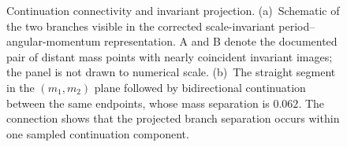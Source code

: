 \begin{figure}[t]
\caption{\label{fig:projection}Continuation connectivity and invariant projection.
(a)~Schematic of the two branches visible in the corrected scale-invariant
period--angular-momentum representation. A and B denote the documented pair
of distant mass points with nearly coincident invariant images; the panel is
not drawn to numerical scale. (b)~The straight segment in the $(m_1,m_2)$
plane followed by bidirectional continuation between the same endpoints,
whose mass separation is $0.062$. The connection shows that the projected
branch separation occurs within one sampled continuation component.}
\end{figure}
